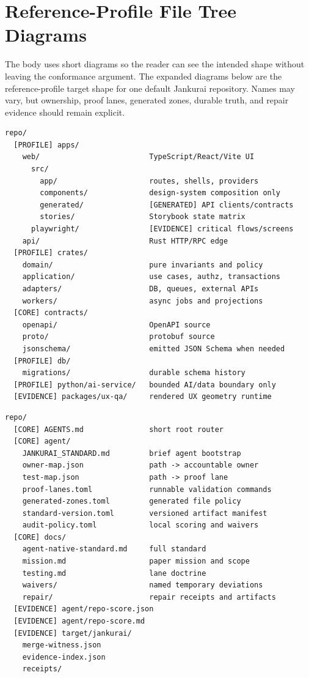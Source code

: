 \section{Reference-Profile File Tree Diagrams}

The body uses short diagrams so the reader can see the intended shape without leaving the conformance argument. The expanded diagrams below are the reference-profile target shape for one default Jankurai repository. Names may vary, but ownership, proof lanes, generated zones, durable truth, and repair evidence should remain explicit.

\begin{lstlisting}[style=codebox]
repo/
  [PROFILE] apps/
    web/                         TypeScript/React/Vite UI
      src/
        app/                     routes, shells, providers
        components/              design-system composition only
        generated/               [GENERATED] API clients/contracts
        stories/                 Storybook state matrix
      playwright/                [EVIDENCE] critical flows/screens
    api/                         Rust HTTP/RPC edge
  [PROFILE] crates/
    domain/                      pure invariants and policy
    application/                 use cases, authz, transactions
    adapters/                    DB, queues, external APIs
    workers/                     async jobs and projections
  [CORE] contracts/
    openapi/                     OpenAPI source
    proto/                       protobuf source
    jsonschema/                  emitted JSON Schema when needed
  [PROFILE] db/
    migrations/                  durable schema history
  [PROFILE] python/ai-service/   bounded AI/data boundary only
  [EVIDENCE] packages/ux-qa/     rendered UX geometry runtime
\end{lstlisting}

\begin{lstlisting}[style=codebox]
repo/
  [CORE] AGENTS.md               short root router
  [CORE] agent/
    JANKURAI_STANDARD.md         brief agent bootstrap
    owner-map.json               path -> accountable owner
    test-map.json                path -> proof lane
    proof-lanes.toml             runnable validation commands
    generated-zones.toml         generated file policy
    standard-version.toml        versioned artifact manifest
    audit-policy.toml            local scoring and waivers
  [CORE] docs/
    agent-native-standard.md     full standard
    mission.md                   paper mission and scope
    testing.md                   lane doctrine
    waivers/                     named temporary deviations
    repair/                      repair receipts and artifacts
  [EVIDENCE] agent/repo-score.json
  [EVIDENCE] agent/repo-score.md
  [EVIDENCE] target/jankurai/
    merge-witness.json
    evidence-index.json
    receipts/
\end{lstlisting}
